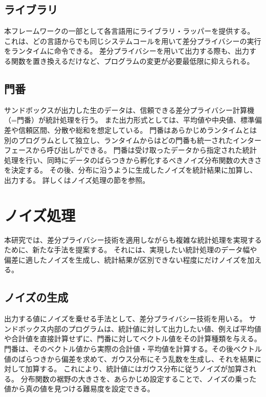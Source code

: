 \documentclass[a4paper,11pt]{jreport}
\begin{document}
\subsection{ライブラリ}

本フレームワークの一部として各言語用にライブラリ・ラッパーを提供する。
これは、どの言語からでも同じシステムコールを用いて差分プライバシーの実行をランタイムに命令できる。
差分プライバシーを用いて出力する際も、出力する関数を置き換えるだけなど、プログラムの変更が必要最低限に抑えられる。

\subsection{門番}

サンドボックスが出力した生のデータは、信頼できる差分プライバシー計算機（=門番）が統計処理を行う。
また出力形式としては、平均値や中央値、標準偏差や信頼区間、分散や総和を想定している。
門番はあらかじめランタイムとは別のプログラムとして独立し、ランタイムからはどの門番も統一されたインターフェースから呼び出しができる。
門番は受け取ったデータから指定された統計処理を行い、同時にデータのばらつきから孵化するべきノイズ分布関数の大きさを決定する。
その後、分布に沿うように生成したノイズを統計結果に加算し、出力する。
詳しくはノイズ処理の節を参照。

\section{ノイズ処理}
本研究では、差分プライバシー技術を適用しながらも複雑な統計処理を実現するために、新たな手法を提案する。
それには、実現したい統計処理のデータ幅や偏差に適したノイズを生成し、統計結果が区別できない程度にだけノイズを加える。

\subsection{ノイズの生成}

出力する値にノイズを乗せる手法として、差分プライバシー技術を用いる。
サンドボックス内部のプログラムは、統計値に対して出力したい値、例えば平均値や合計値を直接計算せずに、門番に対してベクトル値をその計算種類を与える。
門番は、そのベクトル値から実際の合計値・平均値を計算する。その後ベクトル値のばらつきから偏差を求めて、ガウス分布にそう乱数を生成し、それを結果に対して加算する。
これにより、統計値にはガウス分布に従うノイズが加算される。
分布関数の裾野の大きさを、あらかじめ設定することで、ノイズの乗った値から真の値を見つける難易度を設定できる。
\end{document}
